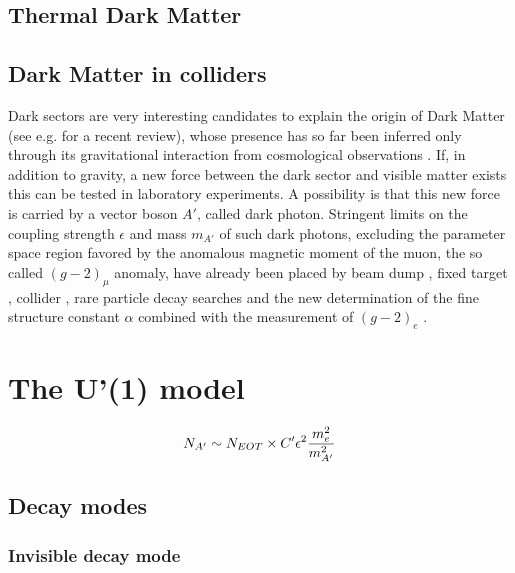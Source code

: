 \subsection{Thermal Dark Matter}
\label{ch1:sec:dm-thermal}

\subsection{Dark Matter in colliders}
\label{ch1:sec:dm-colliders}

Dark sectors are very interesting candidates to explain the origin of Dark Matter (see e.g. \cite{mb} for a recent review), whose presence has 
so far been inferred only through its gravitational interaction from cosmological observations \cite{hooper}. 
If, in addition to gravity, a new force between the dark sector and visible matter exists \cite{prw, pospelov} this can be tested in laboratory experiments. A possibility is that this new force is carried by a vector boson $A'$, called dark photon.
Stringent limits on the coupling strength $\epsilon$ and mass $m_{A'}$ of such dark photons, excluding the parameter space region favored by the anomalous magnetic moment of the muon, the so called $(g-2)_{\mu}$ anomaly, have already been placed by beam dump \cite{jdb, charm, rio, e137, konaka, bross, dav,  ath, nomad, e787, essig1, blum,sg1, blum1, sarah1}, fixed target \cite{apex,merkel,merkel1}, collider \cite{babar, curt, babar1}, rare particle decay searches \cite{sindrum, kloe, sg2, kloe2, wasa, hades, phenix, e949, na48, pol, kloe3} and the new determination of the fine structure constant $\alpha$ combined with the measurement of $(g-2)_e$ \cite{Parker191,PhysRevLett.100.120801}.

\section{The U'(1) model}
\label{ch1:sec:dm-u1model}

\begin{equation}
  \label{eq:dm-rate}
  N_{A'} \sim N_{EOT} \times C' \epsilon^2 \frac{m_e^2}{m^2_{A'}}
\end{equation}

\subsection{Decay modes}
\label{ch1:sec:dm-decay}

\subsubsection{Invisible decay mode}
\label{ch1:sec:dm-decay-invis}

